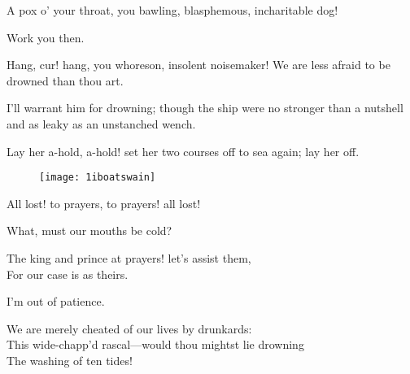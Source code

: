 \begin{prose_speech}[Sebastian] A pox o' your throat, you bawling, blasphemous,
incharitable dog!
\end{prose_speech}

\begin{prose_speech}[Boatswain] Work you then.
	\end{prose_speech}

\begin{prose_speech}[Antonio] Hang, cur! hang, you whoreson, insolent noisemaker! We are less afraid to be drowned than thou art.
\end{prose_speech}

\begin{prose_speech}[Gonzalo] I'll warrant him for drowning; though the ship were no stronger than a nutshell and as leaky as an unstanched wench.
\end{prose_speech}

\begin{prose_speech}[Boatswain] Lay her a-hold, a-hold! set her two courses off to sea again; lay her off.
\end{prose_speech}

\begin{figure}[t]
\centering
\texttt{[image: 1iboatswain]}
\end{figure}


\begin{prose_speech}[Mariners] All lost! to prayers, to prayers! all lost!
	\end{prose_speech}


\begin{prose_speech}[Boatswain] What, must our mouths be cold?
	\end{prose_speech}

\begin{verse_speech}[Gonzalo] The king and prince at prayers! let's assist them,\\ For our case is as theirs.
\end{verse_speech}

\begin{verse_speech}[Sebastian] I'm out of patience.\end{verse_speech}

\begin{verse_speech}[Antonio] We are merely cheated of our lives by drunkards:\\
This wide-chapp'd rascal—would thou mightst lie drowning\\
The washing of ten tides!\end{verse_speech}

